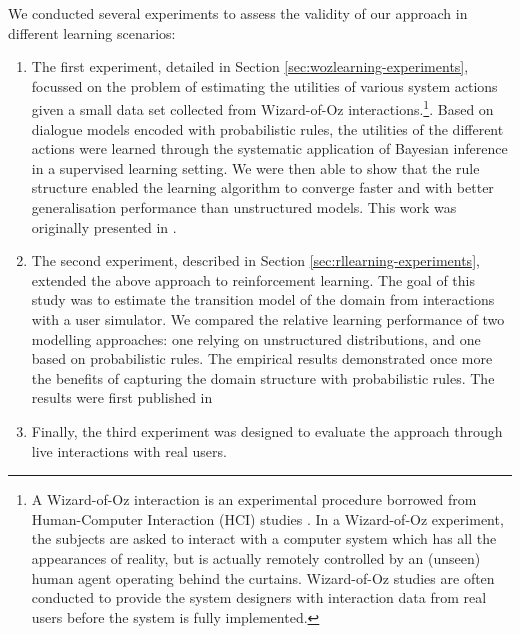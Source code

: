 We conducted several experiments to assess the validity of our approach in different learning scenarios: \begin{enumerate}
\item The first experiment, detailed in Section \ref{sec:wozlearning-experiments}, focussed on the problem of estimating the utilities of various system actions given a small data set collected from Wizard-of-Oz interactions.\footnote{A Wizard-of-Oz interaction is an experimental procedure borrowed from Human-Computer Interaction (HCI) studies \citep{woz93}. In a Wizard-of-Oz experiment, the subjects are asked to interact with a computer system which has all the appearances of reality, but is actually remotely controlled by an (unseen) human agent operating behind the curtains.  Wizard-of-Oz studies are often conducted to provide the system designers with interaction data from real users before the system is fully implemented.}.  Based on dialogue models encoded with probabilistic rules, the utilities of the different actions were learned through the systematic application of Bayesian inference in a supervised learning setting.  We were then able to show that the rule structure enabled the learning algorithm to converge faster and with better generalisation performance than unstructured models. This work was originally presented in \citep{rulebasedmodels-sigdial2012}.
\item The second experiment, described in Section \ref{sec:rllearning-experiments}, extended the above approach to reinforcement learning. The goal of this study was to estimate the transition model of the domain from interactions with a user simulator. We compared the relative learning performance of two modelling approaches: one relying on unstructured distributions, and one based on probabilistic rules. The empirical results demonstrated once more the benefits of capturing the domain structure with probabilistic rules. The results were first published in  
\item Finally, the third experiment was designed to evaluate the approach through live interactions with real users.                     
\end{enumerate}

